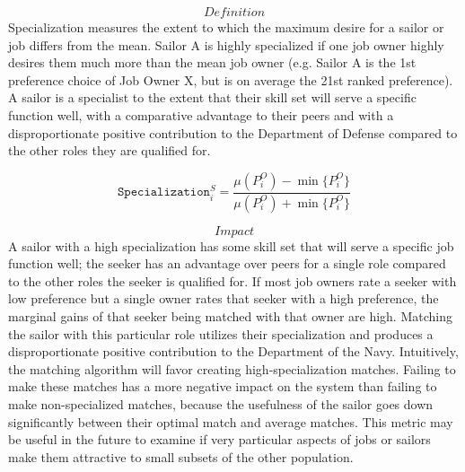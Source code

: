 \[\textit{Definition}\] 
Specialization measures the extent to which the maximum desire for a sailor or job differs from the mean. Sailor A is highly specialized if one job owner highly desires them much more than the mean job owner (e.g. Sailor A is the 1st preference choice of Job Owner X, but is on average the 21st ranked preference). A sailor is a specialist to the extent that their skill set will serve a specific function well, with a comparative advantage to their peers and with a disproportionate positive contribution to the Department of Defense compared to the other roles they are qualified for.

\[\texttt{Specialization}^S_i = \frac{\mu(P^O_i) - \min\{P^O_i\}}{\mu(P^O_i) + \min\{P^O_i\}}\]

\[\textit{Impact}\] 
A sailor with a high specialization has some skill set that will serve a specific job function well; the seeker has an advantage over peers for a single role compared to the other roles the seeker is qualified for. If most job owners rate a seeker with low preference but a single owner rates that seeker with a high preference, the marginal gains of that seeker being matched with that owner are high. Matching the sailor with this particular role utilizes their specialization and produces a disproportionate positive contribution to the Department of the Navy. Intuitively, the matching algorithm will favor creating high-specialization matches. Failing to make these matches has a more negative impact on the system than failing to make non-specialized matches, because the usefulness of the sailor goes down significantly between their optimal match and average matches. This metric may be useful in the future to examine if very particular aspects of jobs or sailors make them attractive to small subsets of the other population.